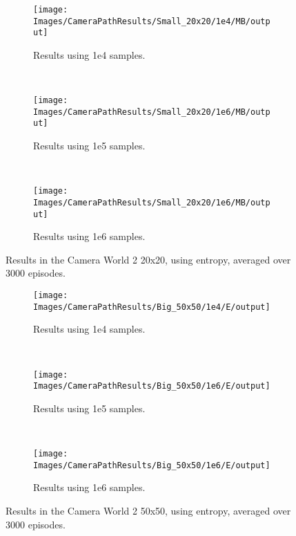 \begin{figure}[ht]
        \centering
        \begin{subfigure}[t]{0.3\textwidth}
                \texttt{[image: Images/CameraPathResults/Small\_20x20/1e4/MB/output]}
                \caption{Results using 1e4 samples.}
                \label{fig:cps4mb}
        \end{subfigure}%
        ~ %
        \begin{subfigure}[t]{0.3\textwidth}
                \texttt{[image: Images/CameraPathResults/Small\_20x20/1e6/MB/output]}
                \caption{Results using 1e5 samples.}
                \label{fig:cps5mb}
        \end{subfigure}
        ~ %
        \begin{subfigure}[t]{0.3\textwidth}
                \texttt{[image: Images/CameraPathResults/Small\_20x20/1e6/MB/output]}
                \caption{Results using 1e6 samples.}
                \label{fig:cps6mb}
        \end{subfigure}
        \caption{Results in the Camera World 2 20x20, using entropy, averaged over 3000 episodes.}\label{fig:cpsmb}
\end{figure}

\begin{figure}[ht]
        \centering
        \begin{subfigure}[t]{0.3\textwidth}
                \texttt{[image: Images/CameraPathResults/Big\_50x50/1e4/E/output]}
                \caption{Results using 1e4 samples.}
                \label{fig:cpb4e}
        \end{subfigure}%
        ~ %
        \begin{subfigure}[t]{0.3\textwidth}
                \texttt{[image: Images/CameraPathResults/Big\_50x50/1e6/E/output]}
                \caption{Results using 1e5 samples.}
                \label{fig:cpb5e}
        \end{subfigure}
        ~ %
        \begin{subfigure}[t]{0.3\textwidth}
                \texttt{[image: Images/CameraPathResults/Big\_50x50/1e6/E/output]}
                \caption{Results using 1e6 samples.}
                \label{fig:cpb6e}
        \end{subfigure}
        \caption{Results in the Camera World 2 50x50, using entropy, averaged over 3000 episodes.}\label{fig:cpbe}
\end{figure}


